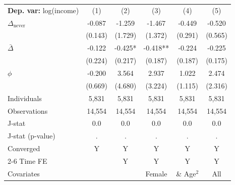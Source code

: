 \begin{tabular}{l ccccc} \toprule  \textbf{Dep. var:}  log(income) 
                    &\multicolumn{1}{c}{(1)}   &\multicolumn{1}{c}{(2)}   &\multicolumn{1}{c}{(3)}   &\multicolumn{1}{c}{(4)}   &\multicolumn{1}{c}{(5)}   \\

\addlinespace
$\Delta_{\text{never}}$&      -0.087   &      -1.259   &      -1.467   &      -0.449   &      -0.520   \\
                    &     (0.143)   &     (1.729)   &     (1.372)   &     (0.291)   &     (0.565)   \\

\addlinespace
$\bar{\Delta}$      &      -0.122   &      -0.425*  &      -0.418** &      -0.224   &      -0.225   \\
                    &     (0.224)   &     (0.217)   &     (0.187)   &     (0.187)   &     (0.175)   \\

\addlinespace
$\phi$              &      -0.200   &       3.564   &       2.937   &       1.022   &       2.474   \\
                    &     (0.669)   &     (4.680)   &     (3.224)   &     (1.115)   &     (2.316)   \\
\addlinespace
Individuals         &       5,831   &       5,831   &       5,831   &       5,831   &       5,831   \\
Observations        &      14,554   &      14,554   &      14,554   &      14,554   &      14,554   \\
J-stat              &         0.0   &         0.0   &         0.0   &         0.0   &         0.0   \\
J-stat (p-value)    &           .   &           .   &           .   &           .   &           .   \\
Converged           &           Y   &           Y   &           Y   &           Y   &           Y   \\
\cmidrule{2-6} Time FE & & Y & Y & Y & Y \\ Covariates & & & Female & \& Age$^2$ & All \\ \bottomrule \end{tabular}
